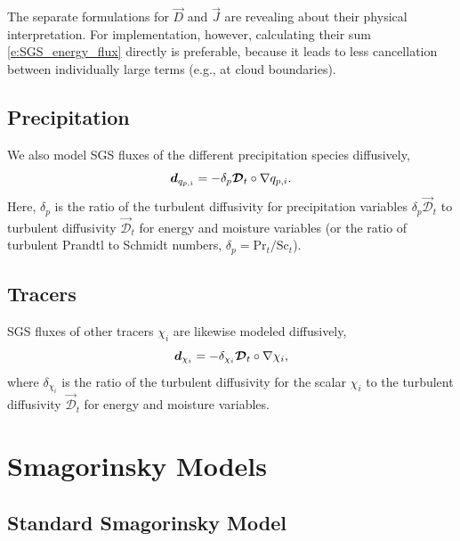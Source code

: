 \documentclass{report}
\begin{document}
The separate formulations for $\vec{D}$ and $\vec{J}$ are revealing about their physical interpretation. For implementation, however, calculating their sum \eqref{e:SGS_energy_flux} directly is preferable, because it leads to less cancellation between individually large terms (e.g., at cloud boundaries).

\subsection{Precipitation}

We also model SGS fluxes of the different precipitation species diffusively,
\begin{equation}\label{e:sgs-precip-flux}
\boldsymbol{{d}}_{q_{p, i}} = - \delta_p \boldsymbol{{\mathcal{D}}}_t \circ \nabla q_{p, i}.
\end{equation}
Here, $\delta_p$ is the ratio of the turbulent diffusivity for precipitation variables $\delta_p \vec{\mathcal{D}}_t$ to turbulent diffusivity $\vec{\mathcal{D}}_t$ for energy and moisture variables (or the ratio of turbulent Prandtl to Schmidt numbers, $\delta_p = \mathrm{Pr}_t/\mathrm{Sc}_t$). 

\subsection{Tracers}

SGS fluxes of other tracers $\chi_i$ are likewise modeled diffusively,
\begin{equation}\label{e:sgs-tracer-flux}
\boldsymbol{{d}}_{\chi_i} = - \delta_{\chi_i} \boldsymbol{{\mathcal{D}}}_t \circ \nabla \chi_i,
\end{equation}
where $\delta_{\chi_i}$ is the ratio of the turbulent diffusivity for the scalar $\chi_i$ to the turbulent diffusivity $\vec{\mathcal{D}}_t$ for energy and moisture variables.

\section{Smagorinsky Models}

\subsection{Standard Smagorinsky Model}
\end{document}
